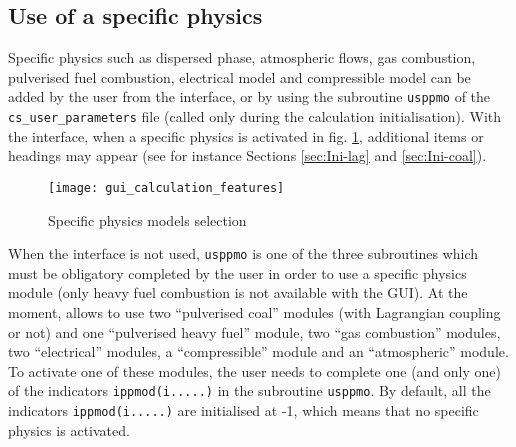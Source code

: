 {{\subsection{Use of a specific physics}
\label{prg_usppmo}%
Specific physics such as dispersed phase, atmospheric flows, gas combustion, 
pulverised fuel combustion, electrical model and compressible model can be 
added by the user from the interface, or by using the subroutine \texttt{usppmo} of 
the \texttt{cs\_user\_parameters} file (called only during the calculation initialisation). 
With the interface, when a specific physics is activated in fig. \ref{fig:5_GUI}, 
additional items or headings may appear (see for instance Sections \ref{sec:Ini-lag} 
and \ref{sec:Ini-coal}).

\begin{figure}[!ht]
\begin{center}
\texttt{[image: gui\_calculation\_features]}
\caption{Specific physics models selection}
\label{fig:5_GUI}
\end{center}
\end{figure}

When the interface is not used, \texttt{usppmo} is one of the three subroutines 
which must be obligatory completed by the user in order to use a specific physics module 
(only heavy fuel combustion is not available with the GUI).
At the moment, \CS allows to use two ``pulverised coal'' modules
(with Lagrangian coupling or not) and one ``pulverised heavy fuel'' module, 
two ``gas combustion'' modules, two ``electrical'' modules, 
a ``compressible'' module and an ``atmospheric'' module. To activate one of
these modules, the user needs to complete one (and only one) of the
indicators \texttt{ippmod(i.....)} in the subroutine
\texttt{usppmo}. By default, all the indicators \texttt{ippmod(i.....)} are
initialised at -1, which means that no specific physics is activated.

}}
